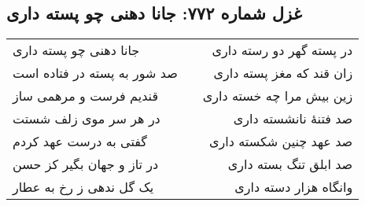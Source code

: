 \begin{center}
\section*{غزل شماره ۷۷۲: جانا دهنی چو پسته داری}
\label{sec:772}
\begin{longtable}{l p{0.5cm} r}
جانا دهنی چو پسته داری
&&
در پسته گهر دو رسته داری
\\
صد شور به پسته در فتاده است
&&
زان قند که مغز پسته داری
\\
قندیم فرست و مرهمی ساز
&&
زین بیش مرا چه خسته داری
\\
در هر سر موی زلف شستت
&&
صد فتنهٔ نانشسته داری
\\
گفتی به درست عهد کردم
&&
صد عهد چنین شکسته داری
\\
در تاز و جهان بگیر کز حسن
&&
صد ابلق تنگ بسته داری
\\
یک گل ندهی ز رخ به عطار
&&
وانگاه هزار دسته داری
\\
\end{longtable}
\end{center}
